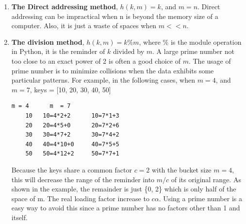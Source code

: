 \documentclass[../main.tex]{subfiles}
\begin{document}
\begin{enumerate}
    \item \textbf{The Direct addressing method}, $h(k, m) = k$, and $m=n$. Direct addressing can be impractical when n is beyond the memory size of a computer. Also, it is just a waste of spaces when $m<<n$. 
    \item \textbf{The division method}, $h(k, m) = k \% m$, where $\%$ is the module operation in Python, it is the reminder of $k$ divided by $m$. A large prime number not too close to an exact power of 2 is often a good choice of $m$. The usage of prime number is to  minimize collisions when the data exhibits some particular patterns. For example, in the following cases, when $m=4$, and $m=7$, keys = [10, 20, 30, 40, 50]
    \begin{lstlisting}[numbers=none]
           m = 4      m  = 7
    10   10=4*2+2      10=7*1+3
    20   20=4*5+0      20=7*2+6
    30   30=4*7+2      30=7*4+2
    40   40=4*10+0     40=7*5+5
    50   50=4*12+2     50=7*7+1
    \end{lstlisting}
    Because the keys share a common factor $c=2$ with the bucket size  $m=4$, this will decrease the range of the reminder into $m/c$ of its original range.
    As shown in the example, the remainder is just \{0, 2\} which is only half of the space of m. The real loading factor increase to $c\alpha$. Using a prime number is a easy way to avoid this since a prime number has no factors other than 1 and itself.
    

\end{enumerate}
\end{document}
